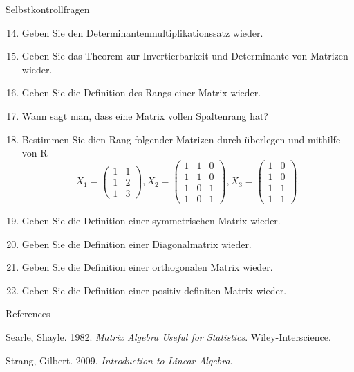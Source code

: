 \documentclass[
  8pt,
  ignorenonframetext,
]{beamer}
\newlength{\cslhangindent}
\newlength{\cslentryspacingunit} %
\newenvironment{CSLReferences}[2] %
 {%
  \setlength{\parindent}{0pt}
  \ifodd #1
  \let\oldpar\par
  \def\par{\hangindent=\cslhangindent\oldpar}
  \fi
  \setlength{\parskip}{#2\cslentryspacingunit}
 }%
 {}
\begin{document}
\begin{frame}{Selbstkontrollfragen}
\protect\hypertarget{selbstkontrollfragen-2}{}
\footnotesize
{}
\begin{enumerate}
\setcounter{enumi}{13}
\item Geben Sie den Determinantenmultiplikationssatz wieder.
\item Geben Sie das Theorem zur Invertierbarkeit und Determinante von Matrizen wieder.
\item Geben Sie die Definition des Rangs einer Matrix wieder.
\item Wann sagt man, dass eine Matrix vollen Spaltenrang hat?
\item Bestimmen Sie dien Rang folgender Matrizen durch überlegen und mithilfe von R
\begin{equation}
X_1 = \begin{pmatrix} 1 & 1 \\ 1 & 2 \\ 1 & 3\end{pmatrix},
X_2 = \begin{pmatrix} 1 & 1 & 0\\ 1 & 1 & 0 \\ 1 & 0 & 1 \\ 1 & 0 & 1\end{pmatrix},
X_3 = \begin{pmatrix} 1 & 0\\ 1 & 0 \\ 1 & 1 \\ 1 & 1\end{pmatrix}.
\end{equation}
\item Geben Sie die Definition einer symmetrischen Matrix wieder.
\item Geben Sie die Definition einer Diagonalmatrix wieder.
\item Geben Sie die Definition einer orthogonalen Matrix wieder.
\item Geben Sie die Definition einer positiv-definiten Matrix wieder.
\end{enumerate}
\end{frame}

\begin{frame}{References}
\protect\hypertarget{references}{}
\footnotesize

\hypertarget{refs}{}
\begin{CSLReferences}{1}{0}
\leavevmode{}%
Searle, Shayle. 1982. \emph{Matrix {Algebra Useful} for {Statistics}}.
{Wiley-Interscience}.

\leavevmode{}%
Strang, Gilbert. 2009. \emph{Introduction to {Linear Algebra}}.

\end{CSLReferences}
\end{frame}
\end{document}

